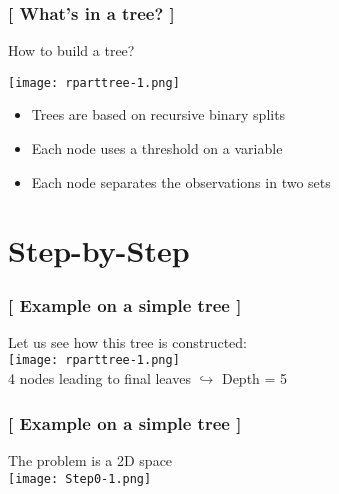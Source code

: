 \documentclass[xcolor=x11names,compress]{beamer}
\renewcommand{\(}{\begin{columns}}
\renewcommand{\)}{\end{columns}}
\newcommand{\<}[1]{\begin{column}{#1}}
\renewcommand{\>}{\end{column}}
\begin{document}
\begin{frame}
\frametitle{\textcolor{brique}{[ What's in a tree? ]}}
How to build a tree?
\begin{center} \texttt{[image: rparttree-1.png]} \end{center}
\pause
\begin{itemize}
    \item Trees are based on recursive binary splits
    \item Each node uses a threshold on a variable
    \item Each node separates the observations in two sets
\end{itemize}
\end{frame}


\section{Step-by-Step}

\begin{frame}
\frametitle{\textcolor{brique}{[ Example on a simple tree ]}}
Let us see how this tree is constructed:\\
\texttt{[image: rparttree-1.png]} \\
4 nodes leading to final leaves $\hookrightarrow$  Depth = 5
\end{frame}

\begin{frame}
\frametitle{\textcolor{brique}{[ Example on a simple tree ]}}
The problem is a 2D space\\
\texttt{[image: Step0-1.png]}
\end{frame}
\end{document}
